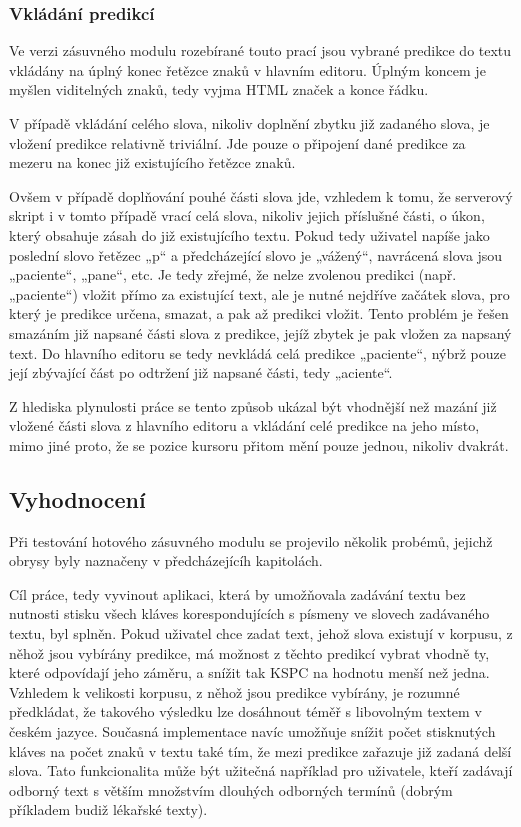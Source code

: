\documentclass[a4paper,11pt]{article}
\begin{document}
\subsubsection{Vkládání predikcí}

Ve verzi zásuvného modulu rozebírané touto prací jsou vybrané predikce do textu vkládány na úplný konec řetězce znaků v hlavním editoru. Úplným koncem je myšlen viditelných znaků, tedy vyjma HTML značek a konce řádku.

V případě vkládání celého slova, nikoliv doplnění zbytku již zadaného slova, je vložení predikce relativně triviální. Jde pouze o připojení dané predikce za mezeru na konec již existujícího řetězce znaků. 

Ovšem v případě doplňování pouhé části slova jde, vzhledem k tomu, že serverový skript i v tomto případě vrací celá slova, nikoliv jejich příslušné části, o úkon, který obsahuje zásah do již existujícího textu. Pokud tedy uživatel napíše jako poslední slovo řetězec „p“ a předcházející slovo je „vážený“, navrácená slova jsou „paciente“, „pane“, etc. Je tedy zřejmé, že nelze zvolenou predikci (např. „paciente“) vložit přímo za existující text, ale je nutné nejdříve začátek slova, pro který je predikce určena, smazat, a pak až predikci vložit. Tento problém je řešen smazáním již napsané části slova z predikce, jejíž zbytek je pak vložen za napsaný text. Do hlavního editoru se tedy nevkládá celá predikce „paciente“, nýbrž pouze její zbývající část po odtržení již napsané části, tedy „aciente“.

Z hlediska plynulosti práce se tento způsob ukázal být vhodnější než mazání již vložené části slova z hlavního editoru a vkládání celé predikce na jeho místo, mimo jiné proto, že se pozice kursoru přitom mění pouze jednou, nikoliv dvakrát.

\subsection{Vyhodnocení}

Při testování hotového zásuvného modulu se projevilo několik probémů, jejichž obrysy byly naznačeny v předcházejícíh kapitolách. 


Cíl práce, tedy vyvinout aplikaci, která by umožňovala zadávání textu bez nutnosti stisku všech kláves korespondujících s písmeny ve slovech zadávaného textu, byl splněn. Pokud uživatel chce zadat text, jehož slova existují v korpusu, z něhož jsou vybírány predikce, má možnost z těchto predikcí vybrat vhodně ty, které odpovídají jeho záměru, a snížit tak KSPC na hodnotu menší než jedna. Vzhledem k velikosti korpusu, z něhož jsou predikce vybírány, je rozumné předkládat, že takového výsledku lze dosáhnout téměř s libovolným textem v českém jazyce. Současná implementace navíc umožňuje snížit počet stisknutých kláves na počet znaků v textu také tím, že mezi predikce zařazuje již zadaná delší slova. Tato funkcionalita může být užitečná například pro uživatele, kteří zadávají odborný text s větším množstvím dlouhých odborných termínů (dobrým příkladem budiž lékařské texty).
\end{document}
